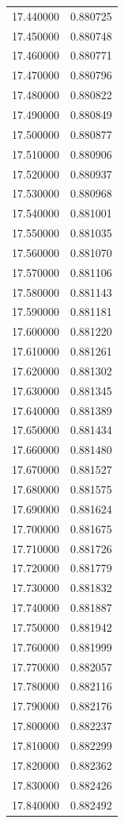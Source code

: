 \begin{tabular}{rr}
17.440000 & 0.880725 \\
17.450000 & 0.880748 \\
17.460000 & 0.880771 \\
17.470000 & 0.880796 \\
17.480000 & 0.880822 \\
17.490000 & 0.880849 \\
17.500000 & 0.880877 \\
17.510000 & 0.880906 \\
17.520000 & 0.880937 \\
17.530000 & 0.880968 \\
17.540000 & 0.881001 \\
17.550000 & 0.881035 \\
17.560000 & 0.881070 \\
17.570000 & 0.881106 \\
17.580000 & 0.881143 \\
17.590000 & 0.881181 \\
17.600000 & 0.881220 \\
17.610000 & 0.881261 \\
17.620000 & 0.881302 \\
17.630000 & 0.881345 \\
17.640000 & 0.881389 \\
17.650000 & 0.881434 \\
17.660000 & 0.881480 \\
17.670000 & 0.881527 \\
17.680000 & 0.881575 \\
17.690000 & 0.881624 \\
17.700000 & 0.881675 \\
17.710000 & 0.881726 \\
17.720000 & 0.881779 \\
17.730000 & 0.881832 \\
17.740000 & 0.881887 \\
17.750000 & 0.881942 \\
17.760000 & 0.881999 \\
17.770000 & 0.882057 \\
17.780000 & 0.882116 \\
17.790000 & 0.882176 \\
17.800000 & 0.882237 \\
17.810000 & 0.882299 \\
17.820000 & 0.882362 \\
17.830000 & 0.882426 \\
17.840000 & 0.882492 \\

\end{tabular}

